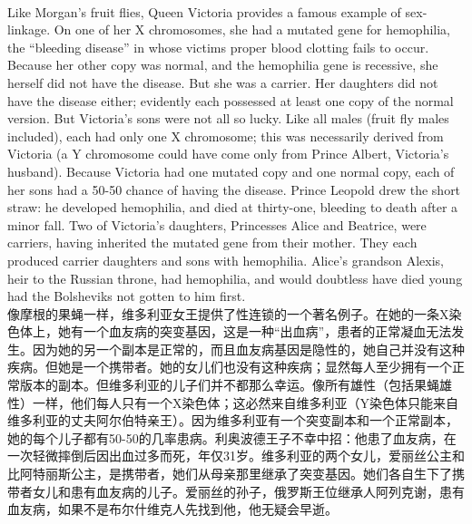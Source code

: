 \documentclass{article}
\begin{document}
\\
Like Morgan’s fruit flies, Queen Victoria provides a famous example of sex-linkage. On one of her X chromosomes, she had a mutated gene for hemophilia, the “bleeding disease” in whose victims proper blood clotting fails to occur. Because her other copy was normal, and the hemophilia gene is recessive, she herself did not have the disease. But she was a carrier. Her daughters did not have the disease either; evidently each possessed at least one copy of the normal version. But Victoria’s sons were not all so lucky. Like all males (fruit fly males included), each had only one X chromosome; this was necessarily derived from Victoria (a Y chromosome could have come only from Prince Albert, Victoria’s husband). Because Victoria had one mutated copy and one normal copy, each of her sons had a 50-50 chance of having the disease. Prince Leopold drew the short straw: he developed hemophilia, and died at thirty-one, bleeding to death after a minor fall. Two of Victoria’s daughters, Princesses Alice and Beatrice, were carriers, having inherited the mutated gene from their mother. They each produced carrier daughters and sons with hemophilia. Alice’s grandson Alexis, heir to the Russian throne, had hemophilia, and would doubtless have died young had the Bolsheviks not gotten to him first.\\
像摩根的果蝇一样，维多利亚女王提供了性连锁的一个著名例子。在她的一条X染色体上，她有一个血友病的突变基因，这是一种“出血病”，患者的正常凝血无法发生。因为她的另一个副本是正常的，而且血友病基因是隐性的，她自己并没有这种疾病。但她是一个携带者。她的女儿们也没有这种疾病；显然每人至少拥有一个正常版本的副本。但维多利亚的儿子们并不都那么幸运。像所有雄性（包括果蝇雄性）一样，他们每人只有一个X染色体；这必然来自维多利亚（Y染色体只能来自维多利亚的丈夫阿尔伯特亲王）。因为维多利亚有一个突变副本和一个正常副本，她的每个儿子都有50-50的几率患病。利奥波德王子不幸中招：他患了血友病，在一次轻微摔倒后因出血过多而死，年仅31岁。维多利亚的两个女儿，爱丽丝公主和比阿特丽斯公主，是携带者，她们从母亲那里继承了突变基因。她们各自生下了携带者女儿和患有血友病的儿子。爱丽丝的孙子，俄罗斯王位继承人阿列克谢，患有血友病，如果不是布尔什维克人先找到他，他无疑会早逝。\\
\end{document}
